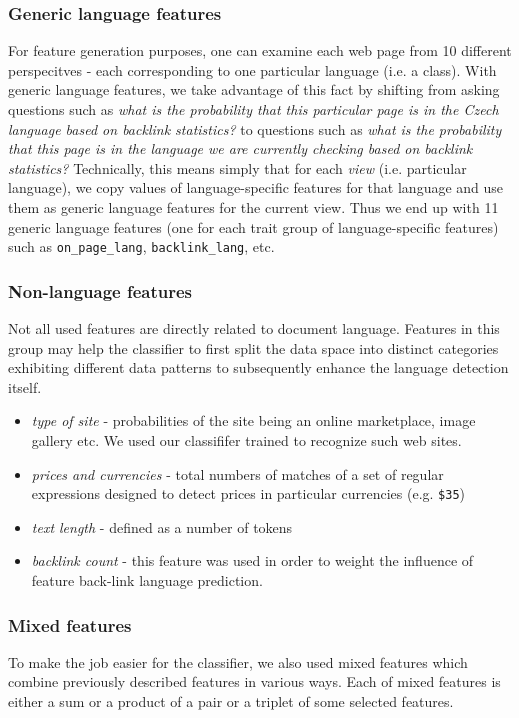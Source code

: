 \documentclass{acm_proc_article-sp}
\begin{document}
{ \subsubsection{Generic language features}
    For feature generation purposes, one can examine each web page from 10 different perspecitves -
    each corresponding to one particular language (i.e. a class). With generic language features, we
    take advantage of this fact by shifting from asking questions such as \textit{what is the probability that 
    this particular page is in the Czech language based on backlink statistics?} to questions 
    such as \textit{what is the probability that this page is in the language we are currently checking 
    based on backlink statistics?} Technically, this means simply
    that for each \textit{view} (i.e. particular language), we copy values of language-specific
    features for that language and use them as generic language features for the current view. Thus
    we end up with 11 generic language features (one for each trait group of language-specific
    features) such as \texttt{on\_page\_lang}, \texttt{backlink\_lang}, etc.
 \subsubsection{Non-language features}
    Not all used features are directly related to document language. Features in this group may help the
    classifier to first split the data space into distinct categories exhibiting different data patterns 
    to subsequently enhance the language detection itself.

    \begin{itemize}
      \item \textit{type of site} - probabilities of the site being an online marketplace, image gallery etc. We used
      our classififer trained to recognize such web sites.
      \item \textit{prices and currencies} - total numbers of matches of a set of regular
      expressions designed to detect prices in particular currencies (e.g. \texttt{\$35}) 
      \item \textit{text length} - defined as a number of tokens
      \item \textit{backlink count} - this feature was used in order to weight the influence of feature
      back-link language prediction.
    \end{itemize}

  \subsubsection{Mixed features}
    To make the job easier for the classifier, we also used mixed features which combine previously
    described features in various ways. Each of mixed features is either a sum or a product of a
    pair or a triplet of some selected features. 

}
\end{document}

